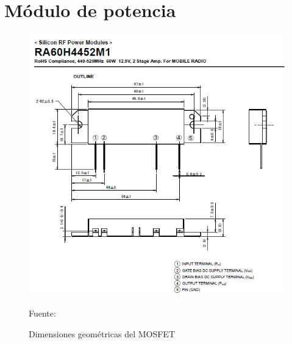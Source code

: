 \chapter{Módulo de potencia}

\begin{figure}[H]
\centering
\includegraphics[scale=1]{Figuras/anexo1.png}
\caption{Dimensiones geométricas del MOSFET}
Fuente:\cite{manual}
\label{anexo1}
\end{figure}